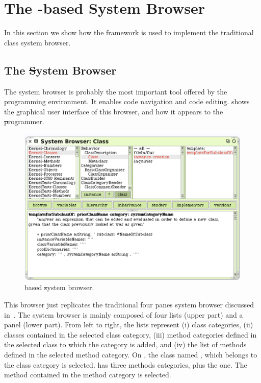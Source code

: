 \documentclass[a4paper,10pt,twoside]{book}
\begin{document}


\section{The \ob-based System Browser} 

In this section we show how the framework is used to implement the traditional class system browser. 

\subsection{The \st System Browser}
The system browser is probably the most important tool offered by the \pharo programming environment. It enables code navigation and code editing.  shows the graphical user interface of this browser, and how it appears to the \st programmer. 


\begin{figure}[!ht]
\begin{center}
\includegraphics[scale=0.50]{obbrowser.pdf}
\caption{\ob based \st system browser.} 
\end{center}
\end{figure}

This browser just replicates the traditional four panes system browser discussed in~.
The system browser is mainly composed of four lists (upper part) and a panel (lower part). From left to right, the lists represent (i) class categories, (ii) classes contained in the selected class category, (iii) method categories defined in the selected class to which the  category is added, and (iv) the list of methods defined in the selected method category. On , the class named , which belongs to the class category  is selected.  has three methods categories, plus the  one. The method  contained in the  method category is selected.
\end{document}
